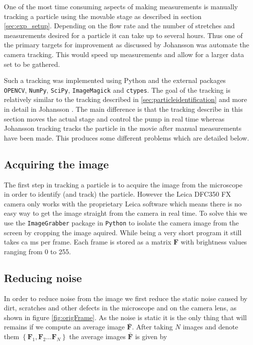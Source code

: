 %
%
%
%
%

One of the most time consuming aspects of making measurements is manually tracking a particle using the movable stage as described in section \ref{sec:exp_setup}. Depending on the flow rate and the number of stretches and measurements desired for a particle it can take up to several hours. Thus one of the primary targets for improvement as discussed by Johansson \cite{AntonThesis} was automate the camera tracking. This would speed up measurements and allow for a larger data set to be gathered. 

Such a tracking was implemented using Python and the external packages \texttt{OPENCV}, \texttt{NumPy}, \texttt{SciPy}, \texttt{ImageMagick} and \texttt{ctypes}. The goal of the tracking is relatively similar to the tracking described in \ref{sec:particleidentification} and more in detail in Johansson \cite{AntonThesis}. The main difference is that the tracking describe in this section moves the actual stage and control the pump in real time whereas Johansson tracking tracks the particle in the movie after manual measurements have been made. This produces some different problems which are detailed below. 

\subsection{Acquiring the image}
The first step in tracking a particle is to acquire the image from the microscope in order to identify (and track) the particle. However the Leica DFC350 FX camera only works with the proprietary Leica software which means there is no easy way to get the image straight from the camera in real time. To solve this we use the \texttt{ImageGrabber} package in \texttt{Python} to isolate the camera image from the screen by cropping the image aquired. While being a very short program it still takes ca \unit[50]{ms} per frame. Each frame is stored as a matrix $\mathbf{F}$ with brightness values ranging from 0 to 255.

\subsection{Reducing noise}
In order to reduce noise from the image we first reduce the static noise caused by dirt, scratches and other defects in the microscope and on the camera lens, as shown in figure \ref{fig:origFrame}. As the noise is static it is the only thing that will remains if we compute an average image $\bar{\mathbf{F}}$. After taking $N$ images and denote them $\left\{\mathbf{F}_1,\mathbf{F}_2 ... \mathbf{F}_N \right\}$ the average images $\bar{\mathbf{F}}$ is given by 

